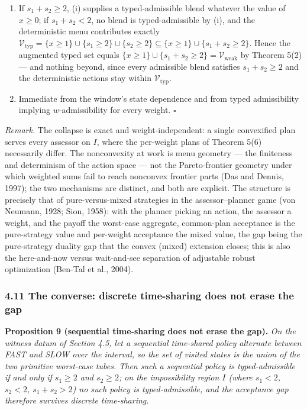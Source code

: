 \documentclass[11pt]{article}
\begin{document}
\begin{enumerate}
\def\labelenumi{(\roman{enumi})}
\setcounter{enumi}{1}
\item
  If \(s_1 + s_2 \ge 2\), (i) supplies a typed-admissible blend whatever
  the value of \(x \ge 0\); if \(s_1 + s_2 < 2\), no blend is
  typed-admissible by (i), and the deterministic menu contributes
  exactly
  \(\mathcal{V}_{\mathrm{typ}} = \{x \ge 1\} \cup \{s_1 \ge 2\} \cup \{s_2 \ge 2\} \subseteq \{x \ge 1\} \cup \{s_1 + s_2 \ge 2\}\).
  Hence the augmented typed set equals
  \(\{x \ge 1\} \cup \{s_1 + s_2 \ge 2\} = \mathcal{V}_{\mathrm{weak}}\)
  by Theorem 5(2) --- and nothing beyond, since every admissible blend
  satisfies \(s_1 + s_2 \ge 2\) and the deterministic actions stay
  within \(\mathcal{V}_{\mathrm{typ}}\).
\item
  Immediate from the window's state dependence and from typed
  admissibility implying \(w\)-admissibility for every weight. \ensuremath{\square}
\end{enumerate}

\emph{Remark.} The collapse is exact and weight-independent: a single
convexified plan serves every assessor on \(I\), where the per-weight
plans of Theorem 5(6) necessarily differ. The nonconvexity at work is
menu geometry --- the finiteness and determinism of the action space ---
not the Pareto-frontier geometry under which weighted sums fail to reach
nonconvex frontier parts (Das and Dennis, 1997); the two mechanisms are
distinct, and both are explicit. The structure is precisely that of
pure-versus-mixed strategies in the assessor--planner game (von Neumann,
1928; Sion, 1958): with the planner picking an action, the assessor a
weight, and the payoff the worst-case aggregate, common-plan acceptance
is the pure-strategy value and per-weight acceptance the mixed value,
the gap being the pure-strategy duality gap that the convex (mixed)
extension closes; this is also the here-and-now versus wait-and-see
separation of adjustable robust optimization (Ben-Tal et al., 2004).

\subsubsection{4.11 The converse: discrete time-sharing does not erase
the
gap}\label{the-converse-discrete-time-sharing-does-not-erase-the-gap}

\textbf{Proposition 9 (sequential time-sharing does not erase the gap).}
\emph{On the witness datum of Section 4.5, let a sequential time-shared
policy alternate between FAST and SLOW over the interval, so the set of
visited states is the union of the two primitive worst-case tubes. Then
such a sequential policy is typed-admissible if and only if
\(s_1 \ge 2\) and \(s_2 \ge 2\); on the impossibility region \(I\)
(where \(s_1 < 2\), \(s_2 < 2\), \(s_1 + s_2 > 2\)) no such policy is
typed-admissible, and the acceptance gap therefore survives discrete
time-sharing.}
\end{document}
